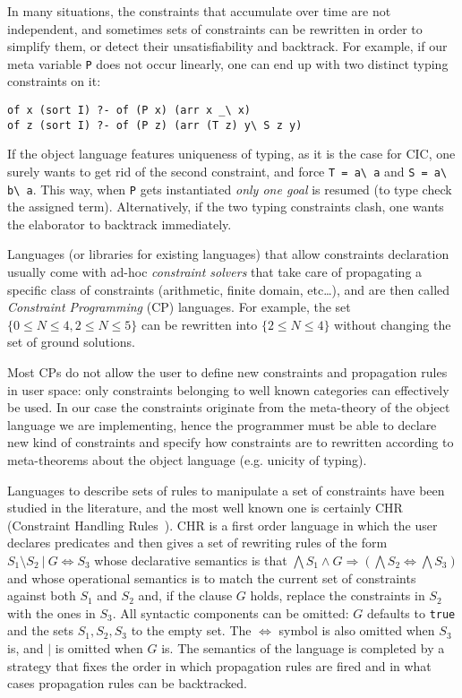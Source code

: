 \documentclass{easychair}
\begin{document}
In many situations, the constraints that accumulate over time are not
independent, and sometimes sets of constraints can be rewritten in
order to simplify them, or detect their unsatisfiability and
backtrack.
For example, if our meta variable \verb+P+ does not occur linearly, one 
can end up with two distinct typing constraints on it:

\begin{Verbatim}
of x (sort I) ?- of (P x) (arr x _\ x)
of z (sort I) ?- of (P z) (arr (T z) y\ S z y)
\end{Verbatim}

If the object language features uniqueness of typing, as it is the case
for CIC, one surely wants to get rid of the second constraint, and
force \verb+T = a\ a+ and \verb+S = a\ b\ a+.
This way, when \verb+P+ gets instantiated \emph{only one goal}
is resumed (to type check the assigned term).  Alternatively,
if the two typing constraints clash, one wants the elaborator to
backtrack immediately.

Languages (or libraries for existing languages) that allow constraints declaration usually
come with ad-hoc \emph{constraint solvers} that take care of
propagating a specific class of constraints (arithmetic, finite
domain, etc\ldots), and are then called \emph{Constraint
Programming} (CP) languages.  For example, the set $\{0 \leq N \leq
4, 2 \leq N \leq 5\}$ can be rewritten into $\{2 \leq N \leq 4\}$
without changing the set of ground solutions.

Most CPs do not allow the user to define new constraints and
propagation rules in user space: only constraints belonging to well
known categories can effectively be used.  In our case the constraints
originate from the meta-theory of the object language we are implementing,
hence the programmer must be able to declare new kind of constraints and
specify how constraints are to rewritten according to meta-theorems about the
object language (e.g. unicity of typing).

Languages to describe sets of rules to manipulate a set of
constraints have been studied in the literature, and the most well
known one is certainly CHR (Constraint Handling Rules~\cite{chr}).
CHR is a first order language in which the user declares predicates
and then gives a set of rewriting rules of the form $S_1 \setminus S_2 ~|~
G \iff S_3$ whose declarative semantics is that $\bigwedge S_1 \wedge
G \Rightarrow (\bigwedge S_2 \iff \bigwedge S_3)$ and whose
operational semantics is to match the current set of constraints
against both $S_1$ and $S_2$ and, if the clause $G$ holds, replace the
constraints in $S_2$ with the ones in $S_3$. All syntactic components
can be omitted: $G$ defaults to \verb+true+ and the sets $S_1,S_2,S_3$
to the empty set. The $\iff$ symbol is also omitted when $S_3$ is, and
$|$ is omitted when $G$ is. The semantics of the language is completed
by a strategy that fixes the order in which propagation rules are
fired and in what cases propagation rules can be backtracked.
\end{document}
